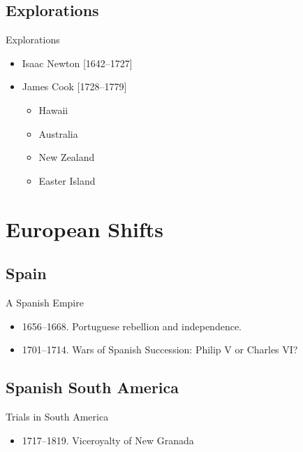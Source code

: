 \subsection{Explorations}
\begin{frame}{Explorations}
	\begin{itemize}
		\item<1->Isaac Newton [1642--1727]
		\item<2->James Cook [1728--1779]
			\begin{itemize}
				\item<3->Hawaii
				\item<4->Australia
				\item<5->New Zealand
				\item<6->Easter Island
		\end{itemize}
	\end{itemize}
\end{frame}

\section{European Shifts}
\subsection{Spain}
\begin{frame}{A Spanish Empire}

	\begin{itemize}
		\item<11-12>1656--1668. Portuguese rebellion and independence.
		\item<12-12>1701--1714. Wars of Spanish Succession: Philip V or Charles VI?
	\end{itemize}
\end{frame}

\subsection{Spanish South America}
\begin{frame}{Trials in South America}
	\begin{itemize}
		\item<2-17>1717--1819. Viceroyalty of New Granada
	\end{itemize}
\end{frame}


